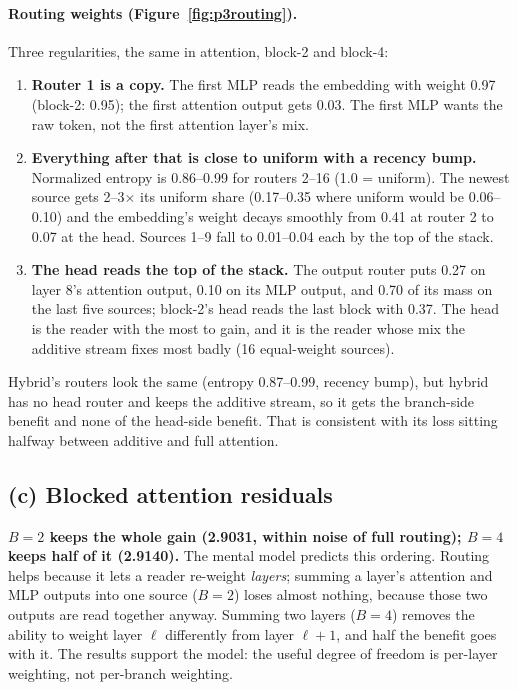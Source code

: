 \paragraph{Routing weights (Figure~\ref{fig:p3routing}).} Three regularities, the same in attention, block-2 and block-4:
\begin{enumerate}[nosep]
\item \textbf{Router 1 is a copy.} The first MLP reads the embedding with weight 0.97 (block-2: 0.95); the first attention output gets 0.03. The first MLP wants the raw token, not the first attention layer's mix.
\item \textbf{Everything after that is close to uniform with a recency bump.} Normalized entropy is 0.86--0.99 for routers 2--16 (1.0 = uniform). The newest source gets 2--3$\times$ its uniform share (0.17--0.35 where uniform would be 0.06--0.10) and the embedding's weight decays smoothly from 0.41 at router 2 to 0.07 at the head. Sources 1--9 fall to 0.01--0.04 each by the top of the stack.
\item \textbf{The head reads the top of the stack.} The output router puts 0.27 on layer 8's attention output, 0.10 on its MLP output, and 0.70 of its mass on the last five sources; block-2's head reads the last block with 0.37. The head is the reader with the most to gain, and it is the reader whose mix the additive stream fixes most badly (16 equal-weight sources).
\end{enumerate}
Hybrid's routers look the same (entropy 0.87--0.99, recency bump), but hybrid has no head router and keeps the additive stream, so it gets the branch-side benefit and none of the head-side benefit. That is consistent with its loss sitting halfway between additive and full attention.



\subsection*{(c) Blocked attention residuals}
\textbf{$B=2$ keeps the whole gain (2.9031, within noise of full routing); $B=4$ keeps half of it (2.9140).} The mental model predicts this ordering. Routing helps because it lets a reader re-weight \emph{layers}; summing a layer's attention and MLP outputs into one source ($B=2$) loses almost nothing, because those two outputs are read together anyway. Summing two layers ($B=4$) removes the ability to weight layer $\ell$ differently from layer $\ell+1$, and half the benefit goes with it. The results support the model: the useful degree of freedom is per-layer weighting, not per-branch weighting.


